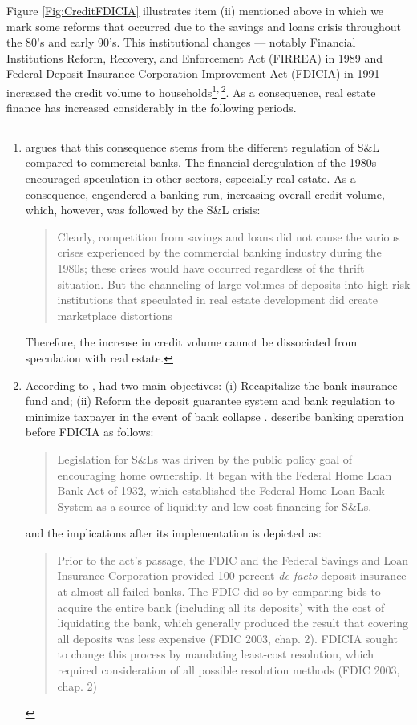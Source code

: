 \documentclass[12pt, a4]{article}
\begin{document}
Figure \ref{Fig:CreditFDICIA} illustrates item (ii) mentioned above in which we mark some reforms that occurred due to the savings and loans crisis throughout the 80's and early 90's.
This institutional changes --- notably Financial Institutions Reform, Recovery, and Enforcement Act (FIRREA) in 1989 and Federal Deposit Insurance Corporation Improvement Act  (FDICIA) in 1991 --- increased the credit volume to households\footnote{\textcite{federal_deposit_insurance_corporation_savings_1997} argues that this consequence stems from the different regulation of S\&L compared to commercial banks. The financial deregulation of the 1980s encouraged speculation in other sectors, especially real estate. As a consequence, engendered a banking run, increasing overall credit volume, which, however, was followed by the S\&L crisis:
\begin{quotation}
Clearly, competition from savings and loans did not cause the various crises experienced by the commercial banking industry during the 1980s; these crises would have occurred regardless of the thrift situation. But the channeling of large volumes of deposits into high-risk institutions that speculated in real estate development did create marketplace distortions \cite[p.~168]{federal_deposit_insurance_corporation_savings_1997}
\end{quotation}
Therefore, the increase in credit volume cannot be dissociated from speculation with real estate.}\textsuperscript{,}\,\footnote{According to \textcite{federal_deposit_insurance_corporation_savings_1997}, had two main objectives:
		(i) Recapitalize the bank insurance fund and;
		(ii) Reform the deposit guarantee system and bank regulation to minimize  taxpayer in the event of bank collapse \cite{mishkin_evaluating_1997}.
		\textcite[p.~170]{federal_deposit_insurance_corporation_savings_1997} describe banking operation before FDICIA as follows:
\begin{quotation}
Legislation for S\&Ls was driven by the public policy goal of encouraging home ownership. It began with the Federal Home Loan Bank Act of 1932, which established the Federal Home Loan Bank System as a source of liquidity and low-cost financing for S\&Ls.
\end{quotation}
and the implications after its implementation is depicted as:
\begin{quotation}
Prior to the act’s passage, the FDIC and the Federal Savings and Loan Insurance Corporation provided 100 percent \textit{de facto} deposit insurance at almost all failed banks. The FDIC did so by comparing bids to acquire the entire bank (including all its deposits) with the cost of liquidating the bank, which generally produced the result that covering all deposits was less expensive (FDIC 2003, chap. 2). FDICIA sought to change this process by mandating least-cost resolution, which required consideration of all possible resolution methods (FDIC 2003, chap. 2) \cite[p.~iii]{wall_too_2010}
\end{quotation}}. 
As a consequence, real estate finance has increased considerably in the following periods.
\end{document}

